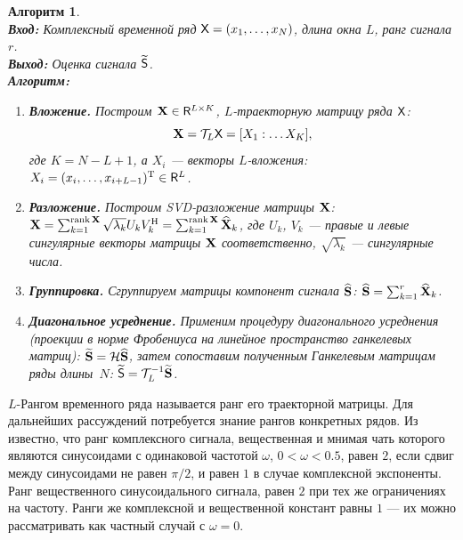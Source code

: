\documentclass[12pt,a4paper]{article}
\newtheorem{algorithm}{Алгоритм}%
\begin{document}
\begin{algorithm}
\label{alg:ssa}
~\\
\textbf{Вход:} Комплексный временной ряд $\textsf{X} = (x_1, \dots, x_N)$, \emph{длина окна} $L$,
    ранг сигнала $r$.\\
\textbf{Выход:} Оценка сигнала $\widetilde{\textsf{S}}$.\\
\textbf{Алгоритм:}
\begin{enumerate}
    \item \textbf{Вложение.}
        \label{item:embedding}
        Построим $\mathbf{X} \in \mathsf{R}^{L \times K}$, \emph{$L$-траекторную матрицу} ряда $\textsf{X}$:
        $$\mathbf{X} = \mathcal{T}_L \textsf{X} = [X_1 : \dots X_K],$$
        где $K = N - L + 1$,
        а $X_i$ --- \emph{векторы $L$-вложения:}
        $X_i = (x_i, \dots, x_{i+L-1})^\mathrm{T} \in \mathsf{R}^L$.
    \item \textbf{Разложение.}
        \label{item:decomposition}
        Построим SVD-разложение матрицы $\mathbf{X}$:
        $\mathbf{X} =
        \sum_{k=1}^{\mathop{\mathrm{rank}} \mathbf{X}} \sqrt{\lambda_k} U_k V_k^\mathrm{H} = \sum_{k=1}^{\mathop{\mathrm{rank}} \mathbf{X}} \widehat{\mathbf{X}}_k$,
        где $U_k$, $V_k$ --- правые и левые сингулярные векторы матрицы $\mathbf{X}$ соответственно,
        $\sqrt{\lambda_k}$ --- сингулярные числа.
    \item \textbf{Группировка.} Сгруппируем матрицы компонент сигнала $\widehat{\mathbf{S}}$:
        $\widehat{\mathbf{S}} = \sum_{k=1}^r \widehat{\mathbf{X}}_k$.
    \item \textbf{Диагональное усреднение.}
        \label{item:reconstruction}
        Применим процедуру диагонального усреднения (проекции в норме Фробениуса
        на линейное пространство ганкелевых матриц):
        $\widetilde{\mathbf{S}} = \mathcal{H} \widehat{\mathbf{S}}$,
        затем сопоставим полученным Ганкелевым матрицам ряды длины~$N$:
        $\widetilde{\textsf{S}} = \mathcal{T}_L^{-1} \widetilde{\mathbf{S}}$.
\end{enumerate}
\end{algorithm}

$L$-Рангом временного ряда называется ранг его траекторной матрицы. Для дальнейших рассуждений потребуется знание рангов конкретных рядов.
Из \cite{Golyandina.Stepanov2005} известно, что ранг комплексного сигнала, вещественная и мнимая чать которого являются синусоидами с одинаковой частотой $\omega$, $0<\omega<0.5$, равен $2$, если сдвиг между синусоидами не равен $\pi/2$, и равен $1$ в случае комплексной экспоненты. Ранг вещественного синусоидального сигнала, равен  $2$ при тех же ограничениях на частоту. Ранги же комплексной и вещественной констант равны $1$ --- их можно рассматривать как частный случай с $\omega = 0$.
\end{document}
